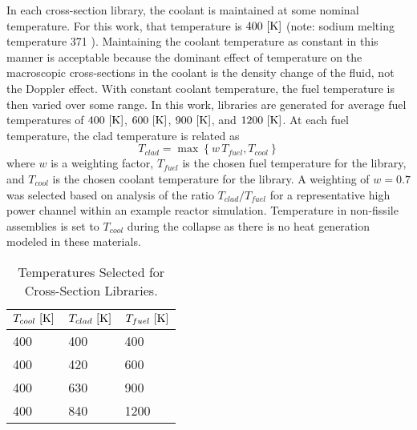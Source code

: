   In each cross-section library, the coolant is maintained at some nominal
  temperature. For this work, that temperature is $400 \,\left[\text{{K}}\right]$
  (note: sodium melting temperature 371 ). Maintaining the coolant
  temperature as constant in this manner is acceptable because the dominant 
  effect of temperature on the macroscopic cross-sections in the coolant is 
  the density change of the fluid, not the Doppler effect. With constant 
  coolant temperature, the fuel temperature is then varied over some range. 
  In this work, libraries are generated for average fuel temperatures
  of $400 \,\left[\text{{K}}\right]$, $600 \,\left[\text{{K}}\right]$, $900 \,\left[\text{{K}}\right]$, and $1200 \,\left[\text{{K}}\right]$.
  At each fuel temperature, the clad temperature is related as 
  \begin{equation}
    T_{clad} = \max \left\{ w \, T_{fuel}, T_{cool} \right\}
  \end{equation}
  where $w$ is a weighting factor, $T_{fuel}$ is the chosen fuel temperature
  for the library, and $T_{cool}$ is the chosen coolant temperature for the
  library. A weighting of $w=0.7$ was selected based on analysis of the ratio
  $T_{clad}/T_{fuel}$ for a representative high power channel
  within an example reactor simulation.  Temperature in non-fissile assemblies 
  is set to $T_{cool}$ during the collapse as there is no heat generation 
  modeled in these materials.

  \begin{table}
    \caption{Temperatures Selected for Cross-Section Libraries.}
    \label{tab:xstemps}
    \begin{center}
      \begin{tabular}{lll}
        \toprule
        $T_{cool} \,\left[\text{{K}}\right]$ & $T_{clad} \,\left[\text{{K}}\right]$ & $T_{fuel} \,\left[\text{{K}}\right]$ \\
        \midrule
        400 & 400 & 400  \\
        400 & 420 & 600  \\
        400 & 630 & 900  \\
        400 & 840 & 1200 \\
        \bottomrule
      \end{tabular}
    \end{center}
  \end{table}

